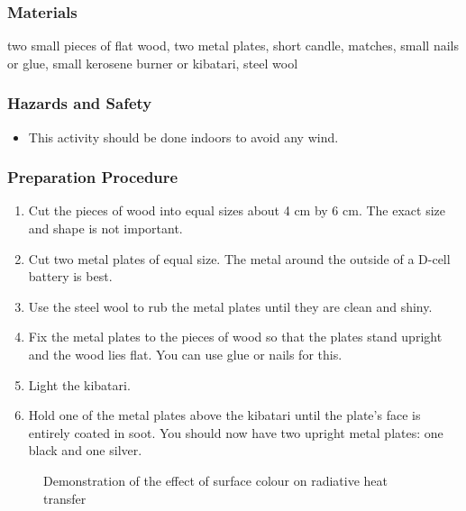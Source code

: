 \subsubsection*{Materials}
two small pieces of flat wood, two metal plates, short candle, matches, small nails or glue, small kerosene burner or kibatari, steel wool

\subsubsection*{Hazards and Safety}
\begin{itemize}
\item{This activity should be done indoors to avoid any wind.}
\end{itemize}

\subsubsection*{Preparation Procedure}
\begin{enumerate}
\item{Cut the pieces of wood into equal sizes about 4 cm by 6 cm.  The exact size and shape is not important.}
\item{Cut two metal plates of equal size.  The metal around the outside of a D-cell battery is best.}
\item{Use the steel wool to rub the metal plates until they are clean and shiny.}
\item{Fix the metal plates to the pieces of wood so that the plates stand upright and the wood lies flat.  You can use glue or nails for this.}
\item{Light the kibatari.}
\item{Hold one of the metal plates above the kibatari until the plate's face is entirely coated in soot.  You should now have two upright metal plates: one black and one silver.}
\end{enumerate}

\begin{figure}
\begin{center}
\def\svgwidth{2cm}

\caption{Demonstration of the effect of surface colour on radiative heat transfer}
\label{fig:radiation}
\end{center}
\end{figure}

